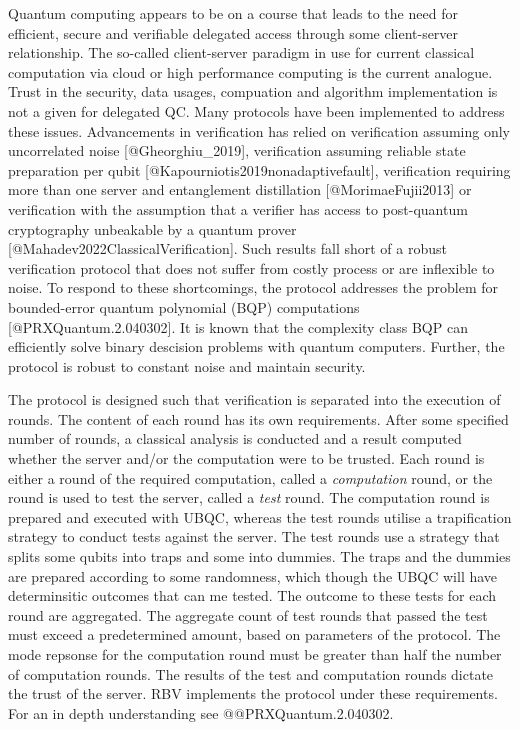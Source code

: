 \documentclass[
]{article}
\begin{document}
Quantum computing appears to be on a course that leads to the need for
efficient, secure and verifiable delegated access through some
client-server relationship. The so-called client-server paradigm in use
for current classical computation via cloud or high performance
computing is the current analogue. Trust in the security, data usages,
compuation and algorithm implementation is not a given for delegated QC.
Many protocols have been implemented to address these issues.
Advancements in verification has relied on verification assuming only
uncorrelated noise {[}@Gheorghiu\_2019{]}, verification assuming
reliable state preparation per qubit
{[}@Kapourniotis2019nonadaptivefault{]}, verification requiring more
than one server and entanglement distillation {[}@MorimaeFujii2013{]} or
verification with the assumption that a verifier has access to
post-quantum cryptography unbeakable by a quantum prover
{[}@Mahadev2022ClassicalVerification{]}. Such results fall short of a
robust verification protocol that does not suffer from costly process or
are inflexible to noise. To respond to these shortcomings, the protocol
addresses the problem for bounded-error quantum polynomial (BQP)
computations {[}@PRXQuantum.2.040302{]}. It is known that the complexity
class BQP can efficiently solve binary descision problems with quantum
computers. Further, the protocol is robust to constant noise and
maintain security.

The protocol is designed such that verification is separated into the
execution of rounds. The content of each round has its own requirements.
After some specified number of rounds, a classical analysis is conducted
and a result computed whether the server and/or the computation were to
be trusted. Each round is either a round of the required computation,
called a \emph{computation} round, or the round is used to test the
server, called a \emph{test} round. The computation round is prepared
and executed with UBQC, whereas the test rounds utilise a trapification
strategy to conduct tests against the server. The test rounds use a
strategy that splits some qubits into traps and some into dummies. The
traps and the dummies are prepared according to some randomness, which
though the UBQC will have determinsitic outcomes that can me tested. The
outcome to these tests for each round are aggregated. The aggregate
count of test rounds that passed the test must exceed a predetermined
amount, based on parameters of the protocol. The mode repsonse for the
computation round must be greater than half the number of computation
rounds. The results of the test and computation rounds dictate the trust
of the server. RBV implements the protocol under these requirements. For
an in depth understanding see @@PRXQuantum.2.040302.
\end{document}
